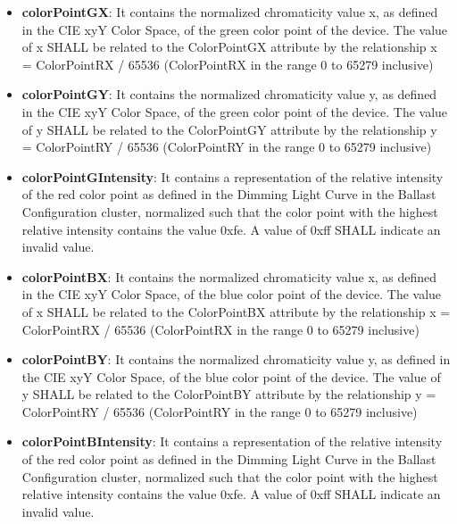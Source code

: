 \begin{itemize}
\item \textbf{colorPointGX}: It contains the normalized chromaticity value x, as defined in the CIE xyY Color Space, of the green color point of the device. The value of x SHALL be related to the ColorPointGX attribute by the relationship x = ColorPointRX / 65536 (ColorPointRX in the range 0 to 65279 inclusive)
\item \textbf{colorPointGY}: It contains the normalized chromaticity value y, as defined in the CIE xyY Color Space, of the green color point of the device. The value of y SHALL be related to the ColorPointGY attribute by the relationship y = ColorPointRY / 65536 (ColorPointRY in the range 0 to 65279 inclusive)
\item \textbf{colorPointGIntensity}: It contains a representation of the relative intensity of the red color point as defined in the Dimming Light Curve in the Ballast Configuration cluster, normalized such that the color point with the highest relative intensity contains the value 0xfe. A value of 0xff SHALL indicate an invalid value.
\item \textbf{colorPointBX}: It contains the normalized chromaticity value x, as defined in the CIE xyY Color Space, of the blue color point of the device. The value of x SHALL be related to the ColorPointBX attribute by the relationship x = ColorPointRX / 65536 (ColorPointRX in the range 0 to 65279 inclusive)
\item \textbf{colorPointBY}: It contains the normalized chromaticity value y, as defined in the CIE xyY Color Space, of the blue color point of the device. The value of y SHALL be related to the ColorPointBY attribute by the relationship y = ColorPointRY / 65536 (ColorPointRY in the range 0 to 65279 inclusive)
\item \textbf{colorPointBIntensity}: It contains a representation of the relative intensity of the red color point as defined in the Dimming Light Curve in the Ballast Configuration cluster, normalized such that the color point with the highest relative intensity contains the value 0xfe. A value of 0xff SHALL indicate an invalid value.
\end{itemize}

